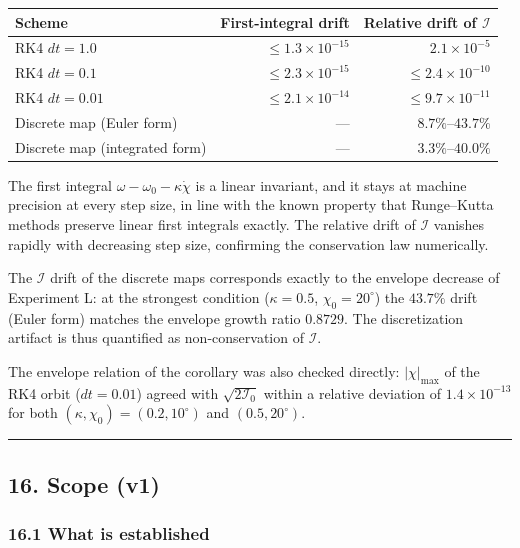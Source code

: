 \documentclass[
  a4paper,
]{article}
\newcounter{none} %
\begin{document}
{\def\LTcaptype{none} %
\begin{longtable}[]{@{}lrr@{}}
\toprule\noalign{}
Scheme & First-integral drift & Relative drift of \(\mathcal I\) \\
\midrule\noalign{}
\endhead
\bottomrule\noalign{}
\endlastfoot
RK4 \(dt=1.0\) & \(\le1.3\times10^{-15}\) & \(2.1\times10^{-5}\) \\
RK4 \(dt=0.1\) & \(\le2.3\times10^{-15}\) & \(\le2.4\times10^{-10}\) \\
RK4 \(dt=0.01\) & \(\le2.1\times10^{-14}\) & \(\le9.7\times10^{-11}\) \\
Discrete map (Euler form) & --- & \(8.7\%\)--\(43.7\%\) \\
Discrete map (integrated form) & --- & \(3.3\%\)--\(40.0\%\) \\
\end{longtable}
}

The first integral \(\omega-\omega_0-\kappa\dot\chi\) is a linear
invariant, and it stays at machine precision at every step size, in line
with the known property that Runge--Kutta methods preserve linear first
integrals exactly. The relative drift of \(\mathcal I\) vanishes rapidly
with decreasing step size, confirming the conservation law numerically.

The \(\mathcal I\) drift of the discrete maps corresponds exactly to the
envelope decrease of Experiment L: at the strongest condition
(\(\kappa=0.5\), \(\chi_0=20^\circ\)) the \(43.7\%\) drift (Euler form)
matches the envelope growth ratio \(0.8729\). The discretization
artifact is thus quantified as non-conservation of \(\mathcal I\).

The envelope relation of the corollary was also checked directly:
\(\lvert\chi\rvert_{\max}\) of the RK4 orbit (\(dt=0.01\)) agreed with
\(\sqrt{2\mathcal I_0}\) within a relative deviation of
\(1.4\times10^{-13}\) for both \((\kappa,\chi_0)=(0.2,10^\circ)\) and
\((0.5,20^\circ)\).

\begin{center}\rule{0.5\linewidth}{0.5pt}\end{center}

\subsection{16. Scope (v1)}\label{scope-v1}

\subsubsection{16.1 What is established}\label{what-is-established}
\end{document}
